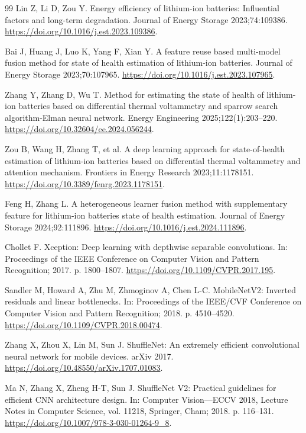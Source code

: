 \begin{thebibliography}{99}
 Lin Z, Li D, Zou Y. Energy efficiency of lithium-ion batteries: Influential factors and long-term degradation. Journal of Energy Storage 2023;74:109386. \url{https://doi.org/10.1016/j.est.2023.109386}.

 Bai J, Huang J, Luo K, Yang F, Xian Y. A feature reuse based multi-model fusion method for state of health estimation of lithium-ion batteries. Journal of Energy Storage 2023;70:107965. \url{https://doi.org/10.1016/j.est.2023.107965}.

 Zhang Y, Zhang D, Wu T. Method for estimating the state of health of lithium-ion batteries based on differential thermal voltammetry and sparrow search algorithm-Elman neural network. Energy Engineering 2025;122(1):203–220. \url{https://doi.org/10.32604/ee.2024.056244}.

 Zou B, Wang H, Zhang T, et al. A deep learning approach for state-of-health estimation of lithium-ion batteries based on differential thermal voltammetry and attention mechanism. Frontiers in Energy Research 2023;11:1178151. \url{https://doi.org/10.3389/fenrg.2023.1178151}.

 Feng H, Zhang L. A heterogeneous learner fusion method with supplementary feature for lithium-ion batteries state of health estimation. Journal of Energy Storage 2024;92:111896. \url{https://doi.org/10.1016/j.est.2024.111896}.

 Chollet F. Xception: Deep learning with depthwise separable convolutions. In: Proceedings of the IEEE Conference on Computer Vision and Pattern Recognition; 2017. p. 1800–1807. \url{https://doi.org/10.1109/CVPR.2017.195}.

 Sandler M, Howard A, Zhu M, Zhmoginov A, Chen L-C. MobileNetV2: Inverted residuals and linear bottlenecks. In: Proceedings of the IEEE/CVF Conference on Computer Vision and Pattern Recognition; 2018. p. 4510–4520. \url{https://doi.org/10.1109/CVPR.2018.00474}.

 Zhang X, Zhou X, Lin M, Sun J. ShuffleNet: An extremely efficient convolutional neural network for mobile devices. arXiv 2017. \url{https://doi.org/10.48550/arXiv.1707.01083}.

 Ma N, Zhang X, Zheng H-T, Sun J. ShuffleNet V2: Practical guidelines for efficient CNN architecture design. In: Computer Vision—ECCV 2018, Lecture Notes in Computer Science, vol. 11218, Springer, Cham; 2018. p. 116–131. \url{https://doi.org/10.1007/978-3-030-01264-9\_8}.


\end{thebibliography}
